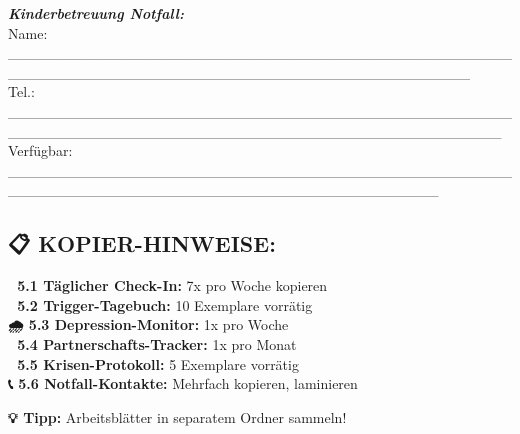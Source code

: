 \emph{\textbf{Kinderbetreuung Notfall:}}\\
Name: \_\_\_\_\_\_\_\_\_\_\_\_\_\_\_\_\_\_\_\_\_\_\_\_\_\_\_\_\_\_\_\_\_\_\_\_\_\_\_\_\_\_\_\_\_\_\_\_\_\_\_\_\_\_\_\_\_\_\_\_\_\_\_\_\_\_\_\_\_\_\_\_\_\_\_\_\_\_\_\_\_\_\_\_\_\_\_\_\_\_\_\_\\
Tel.: \_\_\_\_\_\_\_\_\_\_\_\_\_\_\_\_\_\_\_\_\_\_\_\_\_\_\_\_\_\_\_\_\_\_\_\_\_\_\_\_\_\_\_\_\_\_\_\_\_\_\_\_\_\_\_\_\_\_\_\_\_\_\_\_\_\_\_\_\_\_\_\_\_\_\_\_\_\_\_\_\_\_\_\_\_\_\_\_\_\_\_\_\_\_\_\\
Verfügbar: \_\_\_\_\_\_\_\_\_\_\_\_\_\_\_\_\_\_\_\_\_\_\_\_\_\_\_\_\_\_\_\_\_\_\_\_\_\_\_\_\_\_\_\_\_\_\_\_\_\_\_\_\_\_\_\_\_\_\_\_\_\_\_\_\_\_\_\_\_\_\_\_\_\_\_\_\_\_\_\_\_\_\_\_\_\_\_\_\_

\hypertarget{kopier-hinweise}{%
\subsection{\texorpdfstring{📋 \textbf{KOPIER-HINWEISE:}}{📋 KOPIER-HINWEISE:}}\label{kopier-hinweise}}

\textbf{📅 5.1 Täglicher Check-In:} 7x pro Woche kopieren\\
\textbf{🎢 5.2 Trigger-Tagebuch:} 10 Exemplare vorrätig\\
\textbf{🌧️ 5.3 Depression-Monitor:} 1x pro Woche\\
\textbf{💝 5.4 Partnerschafts-Tracker:} 1x pro Monat\\
\textbf{🚨 5.5 Krisen-Protokoll:} 5 Exemplare vorrätig\\
\textbf{📞 5.6 Notfall-Kontakte:} Mehrfach kopieren, laminieren

\textbf{💡 Tipp:} Arbeitsblätter in separatem Ordner sammeln!


